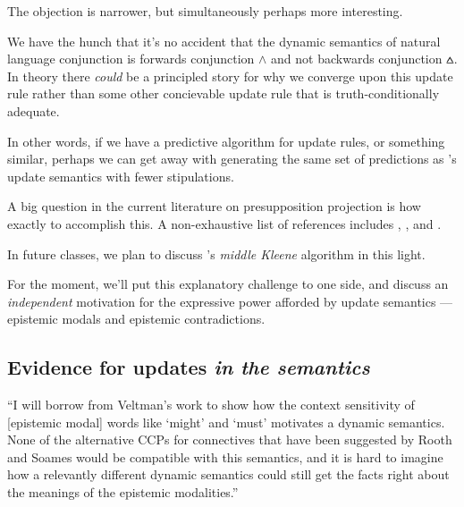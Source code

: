 \documentclass[nols,twoside,nofonts,nobib,nohyper]{tufte-handout}
\theoremstyle{definition}
\begin{document}
The objection is narrower, but simultaneously perhaps more interesting.

We have the hunch that it's no accident that the dynamic semantics of natural language conjunction is forwards conjunction $∧$ and not backwards conjunction $\wedgebar$. In theory there \textit{could} be a principled story for why we converge upon this update rule rather than some other concievable update rule that is truth-conditionally adequate.

In other words, if we have a predictive algorithm for update rules, or something similar, perhaps we can get away with generating the same set of predictions as \citeauthor{Heim1983}'s update semantics with fewer stipulations.

A big question in the current literature on presupposition projection is how exactly to accomplish this. A non-exhaustive list of references includes \cite{George2007,George2008,George2014}, \cite{Schlenker2008,Schlenker2009,Schlenker2010}, and \cite{Fox2013}.

In future classes, we plan to discuss \citeauthor{George2007}'s \textit{middle Kleene} algorithm in this light.

For the moment, we'll put this explanatory challenge to one side, and discuss an \textit{independent} motivation for the expressive power afforded by update semantics --- epistemic modals and epistemic contradictions.

\subsection{Evidence for updates \textit{in the semantics}}


\begin{displayquote}
  \enquote{I will borrow from Veltman’s work to show how the context sensitivity of [epistemic modal] words like `might' and `must' motivates a dynamic semantics. None of the alternative CCPs for connectives
that have been suggested by Rooth and Soames would be compatible with this semantics, and it is hard to imagine how a relevantly different dynamic semantics could still get the facts right about the meanings of the epistemic modalities.}
\end{displayquote}
\end{document}
